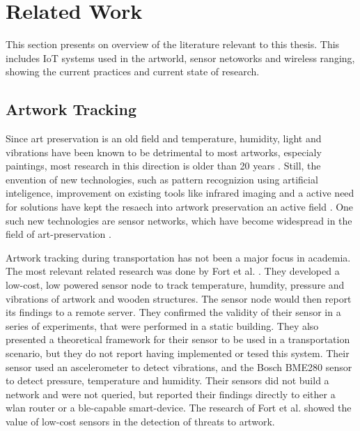 \section{Related Work} %
\label{s:related_works}

This section presents on overview of the literature relevant to this thesis.
This includes IoT systems used in the artworld, sensor netoworks and wireless ranging, showing the current practices and current state of research.


\subsection{Artwork Tracking}


Since art preservation is an old field and temperature, humidity, light and vibrations have been known to be detrimental to most artworks, especialy paintings, most research in this direction is older than 20 years \cite{mecklenburg1991mechanical, michalski1991paintings, saunders2004effect}.
Still, the envention of new technologies, such as pattern recognizion using artificial inteligence, improvement on existing tools like infrared imaging and a active need for solutions have kept the resaech into artwork preservation an active field \cite{borg2020application, schito2017integrated}.
One such new technologies are sensor networks, which have become widespread in the field of art-preservation \cite{shah2016customized}.


Artwork tracking during transportation has not been a major focus in academia.
The most relevant related research was done by Fort et al. \cite{landi2022iot}.
They developed a low-cost, low powered sensor node to track temperature, humdity, pressure and vibrations of artwork and wooden structures.
The sensor node would then report its findings to a remote server.
They confirmed the validity of their sensor in a series of experiments, that were performed in a static building.
They also presented a theoretical framework for their sensor to be used in a transportation scenario, but they do not report having implemented or tesed this system.
Their sensor used an ascelerometer to detect vibrations, and the Bosch BME280 sensor to detect pressure, temperature and humidity.
Their sensors did not build a network and were not queried, but reported their findings directly to either a wlan router or a ble-capable smart-device.
The research of Fort et al. showed the value of low-cost sensors in the detection of threats to artwork.

